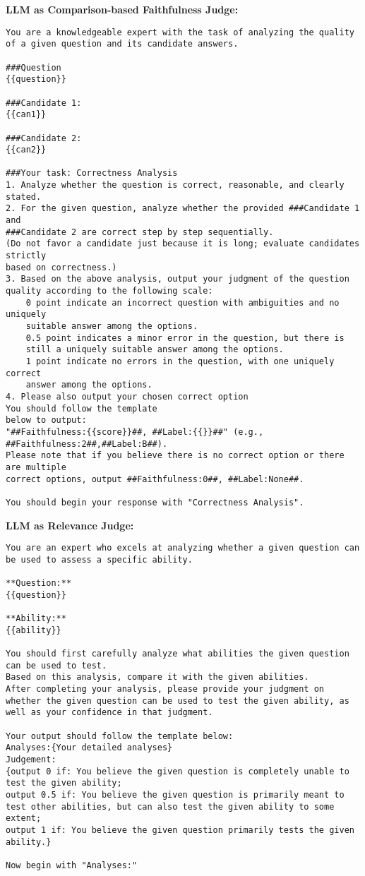 \textbf{LLM as Comparison-based Faithfulness Judge:}
\label{sec:prompt_cmp_judge}
\begin{lstlisting}
You are a knowledgeable expert with the task of analyzing the quality
of a given question and its candidate answers.

###Question
{{question}}

###Candidate 1:
{{can1}}

###Candidate 2:
{{can2}}

###Your task: Correctness Analysis
1. Analyze whether the question is correct, reasonable, and clearly stated.
2. For the given question, analyze whether the provided ###Candidate 1 and
###Candidate 2 are correct step by step sequentially.
(Do not favor a candidate just because it is long; evaluate candidates strictly
based on correctness.)
3. Based on the above analysis, output your judgment of the question
quality according to the following scale:
    0 point indicate an incorrect question with ambiguities and no uniquely 
    suitable answer among the options.
    0.5 point indicates a minor error in the question, but there is 
    still a uniquely suitable answer among the options.
    1 point indicate no errors in the question, with one uniquely correct
    answer among the options.
4. Please also output your chosen correct option
You should follow the template
below to output:
"##Faithfulness:{{score}}##, ##Label:{{}}##" (e.g., ##Faithfulness:2##,##Label:B##).
Please note that if you believe there is no correct option or there are multiple
correct options, output ##Faithfulness:0##, ##Label:None##.

You should begin your response with "Correctness Analysis".

\end{lstlisting}

\textbf{LLM as Relevance Judge:}
\label{sec:prompt_relevance_judge}
\begin{lstlisting}
You are an expert who excels at analyzing whether a given question can be used to assess a specific ability.

**Question:**
{{question}}

**Ability:**
{{ability}}

You should first carefully analyze what abilities the given question can be used to test.
Based on this analysis, compare it with the given abilities.
After completing your analysis, please provide your judgment on whether the given question can be used to test the given ability, as well as your confidence in that judgment.

Your output should follow the template below:
Analyses:{Your detailed analyses}
Judgement:
{output 0 if: You believe the given question is completely unable to test the given ability;
output 0.5 if: You believe the given question is primarily meant to test other abilities, but can also test the given ability to some extent;
output 1 if: You believe the given question primarily tests the given ability.}

Now begin with "Analyses:"
\end{lstlisting}

